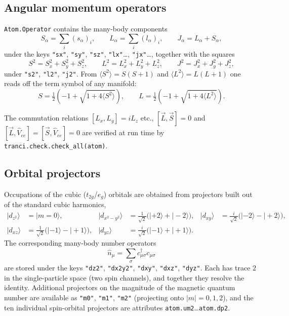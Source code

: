 \documentclass[11pt,a4paper]{article}
\newcommand{\op}[1]{\texttt{#1}}
\newcommand{\cd}[1]{c^{\dagger}_{#1}}
\newcommand{\cc}[1]{c^{\phantom{\dagger}}_{#1}}
\begin{document}
\subsection{Angular momentum operators}

\op{Atom.Operator} contains the many-body components
\begin{equation}
  S_\alpha=\sum_i (s_\alpha)_i,\qquad
  L_\alpha=\sum_i (l_\alpha)_i,\qquad
  J_\alpha=L_\alpha+S_\alpha,
\end{equation}
under the keys \op{"sx"}, \op{"sy"}, \op{"sz"}, \op{"lx"}\ldots, \op{"jx"}\ldots,
together with the squares
\begin{equation}
  S^2=S_x^2+S_y^2+S_z^2,\qquad
  L^2=L_x^2+L_y^2+L_z^2,\qquad
  J^2=J_x^2+J_y^2+J_z^2,
\end{equation}
under \op{"s2"}, \op{"l2"}, \op{"j2"}.  From
$\langle S^2\rangle=S(S+1)$ and $\langle L^2\rangle=L(L+1)$ one reads off the
term symbol of any manifold:
\begin{equation}
  S = \tfrac{1}{2}\left(-1+\sqrt{1+4\langle S^2\rangle}\right),
  \qquad
  L = \tfrac{1}{2}\left(-1+\sqrt{1+4\langle L^2\rangle}\right).
\end{equation}

The commutation relations $[L_x,L_y]=iL_z$ etc., $[\vec L,\vec S]=0$ and
$[\vec L,\hat V_{ee}]=[\vec S,\hat V_{ee}]=0$ are verified at run time by
\op{tranci.check.check\_all(atom)}.

\subsection{Orbital projectors}

Occupations of the cubic ($t_{2g}$/$e_g$) orbitals are obtained from projectors
built out of the standard cubic harmonics,
\begin{align}
  |d_{z^2}\rangle &= |m{=}0\rangle, &
  |d_{x^2-y^2}\rangle &= \tfrac{1}{\sqrt2}\big(|{+}2\rangle+|{-}2\rangle\big), &
  |d_{xy}\rangle &= \tfrac{i}{\sqrt2}\big(|{-}2\rangle-|{+}2\rangle\big),\\
  |d_{xz}\rangle &= \tfrac{1}{\sqrt2}\big(|{-}1\rangle-|{+}1\rangle\big), &
  |d_{yz}\rangle &= \tfrac{i}{\sqrt2}\big(|{-}1\rangle+|{+}1\rangle\big). & &
\end{align}
The corresponding many-body number operators
\begin{equation}
  \hat n_{\mu}=\sum_{\sigma}\cd{\mu\sigma}\cc{\mu\sigma}
\end{equation}
are stored under the keys \op{"dz2"}, \op{"dx2y2"}, \op{"dxy"}, \op{"dxz"},
\op{"dyz"}.  Each has trace $2$ in the single-particle space (two spin
channels), and together they resolve the identity.  Additional projectors on the
magnitude of the magnetic quantum number are available as \op{"m0"}, \op{"m1"},
\op{"m2"} (projecting onto $|m|=0,1,2$), and the ten individual spin-orbital
projectors are attributes \op{atom.um2}\ldots\op{atom.dp2}.
\end{document}
